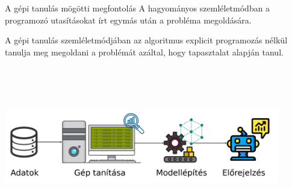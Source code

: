 \documentclass[english, aspectratio=169]{beamer}
\begin{document}
\begin{frame}{A gépi tanulás mögötti megfontolás}
A hagyományos szemléletmódban a programozó utasításokat írt egymás után a probléma megoldására.\par\smallskip
A gépi tanulás szemléletmódjában az algoritmus explicit programozás nélkül tanulja meg megoldani a problémát azáltal, hogy tapasztalat alapján tanul.
\begin{center}
\includegraphics[width=12cm, height=7cm, keepaspectratio]{images/regresszio_2.png}
\end{center}
\end{frame}
\end{document}
